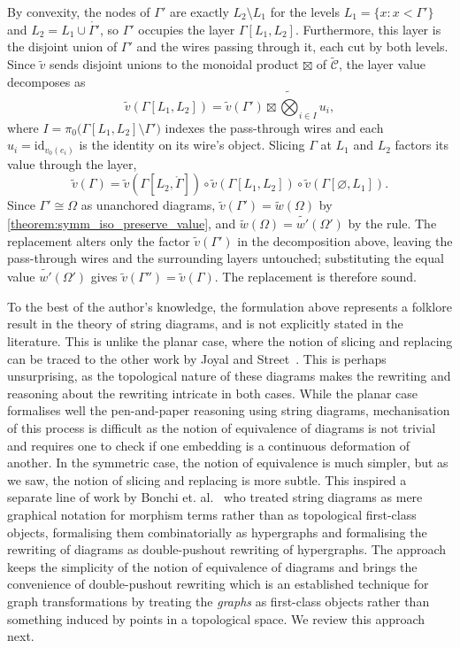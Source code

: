 By convexity, the nodes of $\Gamma'$ are exactly $L_2 \setminus L_1$ for the
levels $L_1 = \{x : x < \Gamma'\}$ and $L_2 = L_1 \cup \mathring{\Gamma'}$, so
$\Gamma'$ occupies the layer $\Gamma[L_1, L_2]$. Furthermore, this layer is the disjoint union of $\Gamma'$ and the wires passing
through it, each cut by both levels. Since $\widetilde{v}$ sends disjoint unions
to the monoidal product $\boxtimes$ of $\widetilde{\mathcal{C}}$, the layer value
decomposes as
\[
  \widetilde{v}(\Gamma[L_1, L_2])
  = \widetilde{v}(\Gamma') \boxtimes \widetilde{\bigotimes}_{i \in I} u_i,
\]
where $I = \pi_0\big(\Gamma[L_1, L_2] \setminus \Gamma'\big)$ indexes the
pass-through wires and each $u_i = \mathrm{id}_{v_0(e_i)}$ is the identity on its
wire's object. Slicing $\Gamma$ at $L_1$ and $L_2$ factors its value through the
layer,
\[
  \widetilde{v}(\Gamma)
  = \widetilde{v}(\Gamma[L_2, \mathring{\Gamma}])
    \circ \widetilde{v}(\Gamma[L_1, L_2])
    \circ \widetilde{v}(\Gamma[\varnothing, L_1]).
\]
Since $\Gamma' \cong \Omega$ as unanchored diagrams,
$\widetilde{v}(\Gamma') = \widetilde{w}(\Omega)$ by \cref{theorem:symm_iso_preserve_value},
and $\widetilde{w}(\Omega) = \widetilde{w'}(\Omega')$ by the rule. The replacement
alters only the factor $\widetilde{v}(\Gamma')$ in the decomposition above,
leaving the pass-through wires and the surrounding layers untouched; substituting
the equal value $\widetilde{w'}(\Omega')$ gives
$\widetilde{v}(\Gamma'') = \widetilde{v}(\Gamma)$. The replacement is therefore
sound.

\begin{remark}
To the best of the author's knowledge, the formulation above represents a folklore result in the theory of string diagrams, and is not explicitly stated in the literature.
This is unlike the planar case, where the notion of slicing and replacing can be traced to the other work by Joyal and Street~\cite{joyal_geometry_II}.
This is perhaps unsurprising, as the topological nature of these diagrams makes the rewriting and reasoning about the rewriting intricate in both cases.
While the planar case formalises well the pen-and-paper reasoning using string diagrams, mechanisation of this process is difficult as the notion of equivalence of diagrams is not trivial and requires one to check if one embedding is a continuous deformation of another.
In the symmetric case, the notion of equivalence is much simpler, but as we saw, the notion of slicing and replacing is more subtle.
This inspired a separate line of work by Bonchi et. al.~\cite{bonchi_string_2022-1,bonchi_string_2022-2,bonchi_string_2022-3,zanassi_comonoid} who treated string diagrams as mere graphical notation for morphism terms rather than as topological first-class objects, formalising them combinatorially as hypergraphs and formalising the rewriting of diagrams as double-pushout rewriting of hypergraphs.
The approach keeps the simplicity of the notion of equivalence of diagrams and brings the convenience of double-pushout rewriting which is an established technique for graph transformations by treating the \emph{graphs} as first-class objects rather than something induced by points in a topological space.
We review this approach next.
\end{remark}

